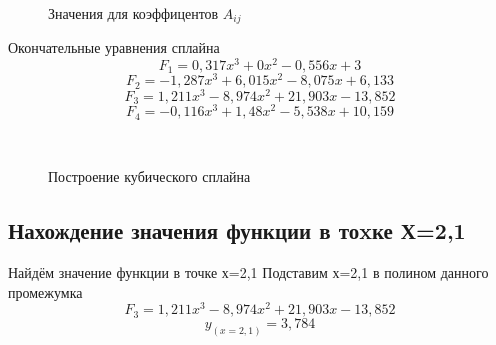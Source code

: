 \documentclass[russian,utf8,nocolumnxxxi,nocolumnxxxii]{eskdtext}
\begin{document}
\begin{figure}[H]
 \\
\caption{Значения для коэффицентов $A_{ij}$}
\end{figure}

Окончательные уравнения сплайна
$$F_1=0,317x^3+0x^2-0,556x+3$$
$$F_2=-1,287x^3+6,015x^2-8,075x+6,133$$
$$F_3=1,211x^3-8,974x^2+21,903x-13,852$$
$$F_4=-0,116x^3+1,48x^2-5,538x+10,159$$

\begin{figure}[H]
 \\
\caption{Построение кубического сплайна}
\end{figure}

\subsection{Нахождение значения функции в тоxке Х=2,1}
Найдём значение функции в точке х=2,1
Подставим х=2,1 в полином данного промежумка 
$$F_3=1,211x^3-8,974x^2+21,903x-13,852$$
$$y_{(x=2,1)}=3,784$$
\end{document}
